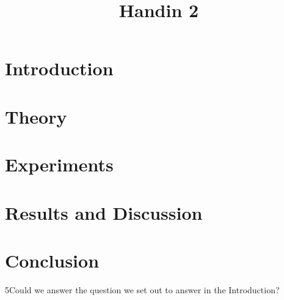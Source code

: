 \documentclass[12pt]{article}
\title{Handin 2}
\begin{document}
\maketitle

\section{Introduction}


\section{Theory}



\section{Experiments}



\section{Results and Discussion}


\section{Conclusion}

5Could we answer the question we set out to answer in the Introduction?
\end{document}
